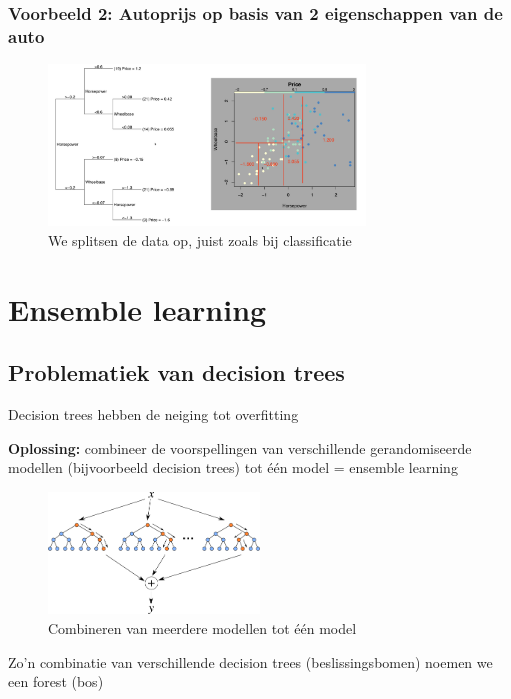 \documentclass{article}
\begin{document}
\subsubsection{Voorbeeld 2: Autoprijs op basis van 2 eigenschappen van de auto}

\begin{figure}[H]
    \centering
    \includegraphics[width=0.75\textwidth]{decision-trees-regressie3.png}
    \caption{We splitsen de data op, juist zoals bij classificatie}
\end{figure}

\section{Ensemble learning}

\subsection{Problematiek van decision trees}

Decision trees hebben de neiging tot overfitting

\textbf{Oplossing:} combineer de voorspellingen van verschillende gerandomiseerde modellen
(bijvoorbeeld decision trees) tot één model = ensemble learning

\begin{figure}[H]
    \centering
    \includegraphics[width=0.5\textwidth]{ensemble-learning.png}
    \caption{Combineren van meerdere modellen tot één model}
\end{figure}

Zo'n combinatie van verschillende decision trees (beslissingsbomen) noemen we een forest (bos)
\end{document}
